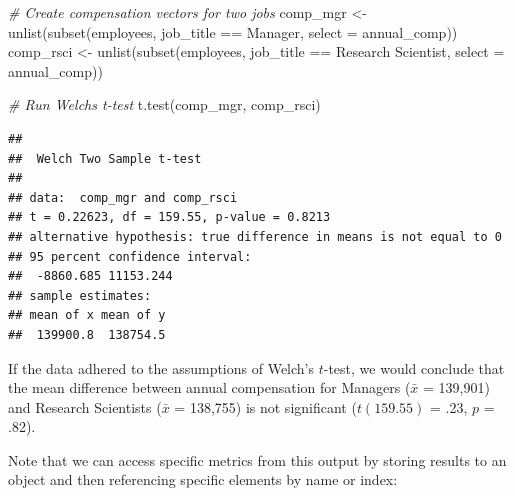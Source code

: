 \documentclass[
]{book}
\newenvironment{Shaded}{\begin{snugshade}}{\end{snugshade}}
\newcommand{\AttributeTok}[1]{\textcolor[rgb]{0.77,0.63,0.00}{#1}}
\newcommand{\CommentTok}[1]{\textcolor[rgb]{0.56,0.35,0.01}{\textit{#1}}}
\newcommand{\FunctionTok}[1]{\textcolor[rgb]{0.00,0.00,0.00}{#1}}
\newcommand{\NormalTok}[1]{#1}
\newcommand{\OtherTok}[1]{\textcolor[rgb]{0.56,0.35,0.01}{#1}}
\newcommand{\SpecialCharTok}[1]{\textcolor[rgb]{0.00,0.00,0.00}{#1}}
\newcommand{\StringTok}[1]{\textcolor[rgb]{0.31,0.60,0.02}{#1}}
\begin{document}
\begin{Shaded}
\begin{Highlighting}[]
\CommentTok{\# Create compensation vectors for two jobs}
\NormalTok{comp\_mgr }\OtherTok{\textless{}{-}} \FunctionTok{unlist}\NormalTok{(}\FunctionTok{subset}\NormalTok{(employees, job\_title }\SpecialCharTok{==} \StringTok{\textquotesingle{}Manager\textquotesingle{}}\NormalTok{, }\AttributeTok{select =}\NormalTok{ annual\_comp))}
\NormalTok{comp\_rsci }\OtherTok{\textless{}{-}} \FunctionTok{unlist}\NormalTok{(}\FunctionTok{subset}\NormalTok{(employees, job\_title }\SpecialCharTok{==} \StringTok{\textquotesingle{}Research Scientist\textquotesingle{}}\NormalTok{, }\AttributeTok{select =}\NormalTok{ annual\_comp))}

\CommentTok{\# Run Welch\textquotesingle{}s t{-}test}
\FunctionTok{t.test}\NormalTok{(comp\_mgr, comp\_rsci)}
\end{Highlighting}
\end{Shaded}

\begin{verbatim}
## 
##  Welch Two Sample t-test
## 
## data:  comp_mgr and comp_rsci
## t = 0.22623, df = 159.55, p-value = 0.8213
## alternative hypothesis: true difference in means is not equal to 0
## 95 percent confidence interval:
##  -8860.685 11153.244
## sample estimates:
## mean of x mean of y 
##  139900.8  138754.5
\end{verbatim}

If the data adhered to the assumptions of Welch's \(t\)-test, we would conclude that the mean difference between annual compensation for Managers (\(\bar{x}\) = 139,901) and Research Scientists (\(\bar{x}\) = 138,755) is not significant (\(t(159.55)\) = .23, \(p\) = .82).

Note that we can access specific metrics from this output by storing results to an object and then referencing specific elements by name or index:

\begin{Shaded}
\end{Shaded}
\end{document}
